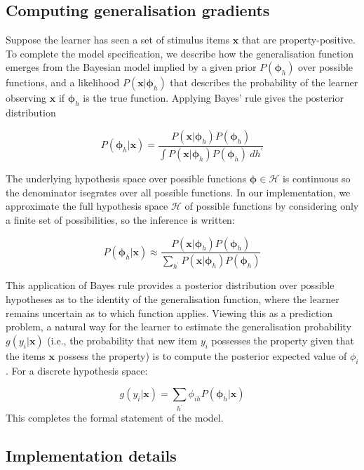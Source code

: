\documentclass[
  english,
  doc]{apa6}
\begin{document}
\hypertarget{computing-generalisation-gradients}{%
\subsection{Computing generalisation gradients}\label{computing-generalisation-gradients}}

\noindent
Suppose the learner has seen a set of stimulus items \(\bm x\) that are property-positive. To complete the model specification, we describe how the generalisation function emerges from the Bayesian model implied by a given prior \(P(\bm{\phi}_h)\) over possible functions, and a likelihood \(P(\bm x | \bm{\phi}_h)\) that describes the probability of the learner observing \(\bm x\) if \(\bm{\phi}_h\) is the true function. Applying Bayes' rule gives the posterior distribution

\[ 
P({\bm \phi}_h | \bm x) = \frac{P(\bm x | \bm{\phi}_h) P(\bm{\phi}_h)}{\int P(\bm x | \bm{\phi}_h) P(\bm{\phi}_h) \ dh^\prime}
\]

\noindent
The underlying hypothesis space over possible functions \(\bm \phi \in \mathcal H\) is continuous so the denominator isegrates over all possible functions. In our implementation, we approximate the full hypothesis space \(\mathcal{H}\) of possible functions by considering only a finite set of possibilities, so the inference is written:

\[ 
P({\bm \phi}_h | \bm x) \approx \frac{P(\bm x | \bm{\phi}_h) P(\bm{\phi}_h)}{\sum_{h^\prime} P(\bm x | \bm{\phi}_h) P(\bm{\phi}_h)}
\]

\noindent
This application of Bayes rule provides a posterior distribution over possible hypotheses as to the identity of the generalisation function, where the learner remains uncertain as to which function applies. Viewing this as a prediction problem, a natural way for the learner to estimate the generalisation probability \(g(y_i | \bm{x})\) (i.e., the probability that new item \(y_i\) possesses the property given that the items \(\bm x\) possess the property) is to compute the posterior expected value of \(\phi_i\). For a discrete hypothesis space:

\[
g(y_i | \bm{x}) = \sum_{h^\prime} \phi_{ih} P({\bm \phi}_h | \bm x)
\]
This completes the formal statement of the model.

\hypertarget{implementation-details}{%
\subsection{Implementation details}\label{implementation-details}}
\end{document}
